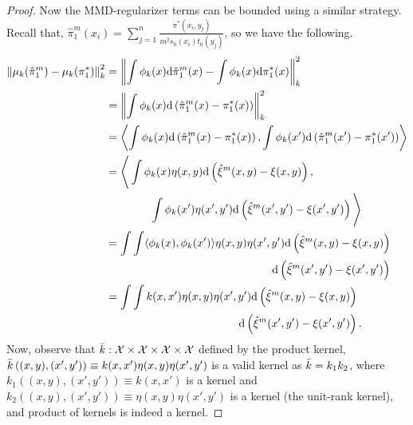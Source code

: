 \begin{proof}
Now the MMD-regularizer terms can be bounded using a similar strategy. Recall that, $\hat{\pi}^m_1(x_i)=\sum_{j=1}^n\frac{\pi^*(x_i, y_j)}{m^2s_0(x_i)t_0(y_j)}$, so we have the following.
\begin{align*}
    \left\|\mu_k(\hat{\pi}^m_1)-\mu_k(\pi^*_1)\right\|_k^2
    &=\left\|\int\phi_k(x)\textup{d}\hat{\pi}^m_1(x)-\int\phi_k(x)\textup{d}\pi^*_1(x)\right\|_k^2\\
    &=\left\|\int\phi_k(x)\textup{d}\left(\hat{\pi}^m_1(x)-\pi^*_1(x)\right)\right\|_k^2\\
    &=\left\langle\int\phi_k(x)\textup{d}\left(\hat{\pi}^m_1(x)-\pi^*_1(x)\right),\int\phi_k(x')\textup{d}\left(\hat{\pi}^m_1(x')-\pi^*_1(x')\right)\right\rangle\\
    &=\Bigg<\int\phi_k(x)\eta(x,y)\textup{d}\left(\hat{\xi}^m(x,y)-\xi(x,y)\right),\\
    &\qquad\qquad \int\phi_k(x')\eta(x',y')\textup{d}\left(\hat{\xi}^m(x',y')-\xi(x',y')\right)\Bigg>\\
    &=\int\int\langle\phi_k(x),\phi_k(x')\rangle\eta(x,y)\eta(x',y')\textup{d}\left(\hat{\xi}^m(x,y)-\xi(x,y)\right)
    \\
    &\qquad\qquad\qquad\qquad\qquad\qquad\qquad\quad \textup{d}\left(\hat{\xi}^m(x',y')-\xi(x',y')\right)\\
    &=\int\int k(x,x')\eta(x,y)\eta(x',y')\textup{d}\left(\hat{\xi}^m(x,y)-\xi(x,y)\right)\\
    &\qquad\qquad\qquad\qquad\qquad\qquad \textup{d}\left(\hat{\xi}^m(x',y')-\xi(x',y')\right).
\end{align*}
Now, observe that $\bar{k}:\mathcal{X}\times\mathcal{X}\times\mathcal{X}\times\mathcal{X}$ defined by the product kernel, $\bar{k}\left((x,y),(x',y')\right)\equiv k(x,x')\eta(x,y)\eta(x',y')$ is a valid kernel as $\bar{k}=k_1k_2$, where $k_1\left((x,y),(x',y')\right)\equiv k(x, x')$ is a kernel and $k_2\left((x,y),(x',y')\right)\equiv\eta(x,y)\eta(x',y')$ is a kernel (the unit-rank kernel), and product of kernels is indeed a kernel. 


\end{proof}
